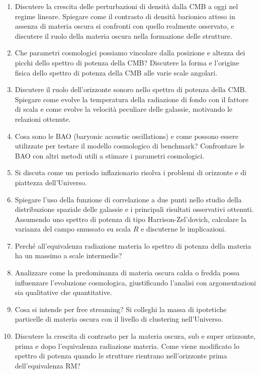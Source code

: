 \begin{enumerate}
    \item Discutere la crescita delle perturbazioni di densità dalla CMB a oggi nel regime lineare. Spiegare come il contrasto di densità barionico atteso in assenza di materia oscura si confronti con quello realmente osservato, e discutere il ruolo della materia oscura nella formazione delle strutture.
    \item Che parametri cosmologici possiamo vincolare dalla posizione e altezza dei picchi dello spettro di potenza della CMB? Discutere la forma e l’origine fisica dello spettro di potenza della CMB alle varie scale angolari.
    \item  Discutere il ruolo dell’orizzonte sonoro nello spettro di potenza della CMB. Spiegare come evolve la temperatura della radiazione di fondo con il fattore di scala e come evolve la velocità peculiare delle galassie, motivando le relazioni ottenute.
    \item Cosa sono le BAO (baryonic acoustic oscillations) e come possono essere utilizzate per testare il modello cosmologico di benchmark? Confrontare le BAO con altri metodi utili a stimare i parametri cosmologici.
    \item Si discuta come un periodo inflazionario risolva i problemi di orizzonte e di piattezza dell’Universo.
    \item  Spiegare l’uso della funzione di correlazione a due punti nello studio della distribuzione spaziale delle galassie e i principali risultati osservativi ottenuti. Assumendo uno spettro di potenza di tipo Harrison-Zel’dovich, calcolare la varianza del campo smussato su scala $R$ e discuterne le implicazioni.
    \item Perché all’equivalenza radiazione materia lo spettro di potenza della materia ha un massimo a scale intermedie?
    \item Analizzare come la predominanza di materia oscura calda o fredda possa influenzare l'evoluzione cosmologica, giustificando l’analisi con argomentazioni sia qualitative che quantitative.
    \item Cosa si intende per free streaming? Si colleghi la massa di ipotetiche particelle di materia oscura con il livello di clustering nell’Universo.
    \item Discutere la crescita di contrasto per la materia oscura, sub e super orizzonte, prima e dopo l’equivalenza radiazione materia. Come viene modificato lo spettro di potenza quando le strutture rientrano nell’orizzonte prima dell’equivalenza RM?
\end{enumerate}